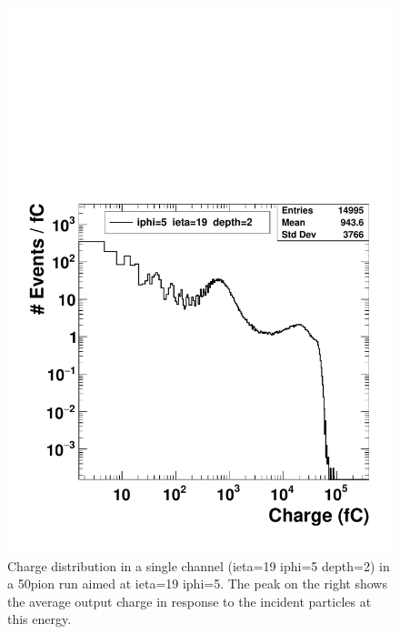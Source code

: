 \begin{figure}
\centering
\includegraphics[width=0.7\linewidth]{Figures/pioncharge.pdf}
\caption{Charge distribution in a single channel (ieta=19 iphi=5 depth=2) in a 50\GeV pion run aimed at ieta=19 iphi=5. The peak on the right shows the average output charge in response to the incident particles at this energy.}
\label{fig:pioncharge}
\end{figure}

